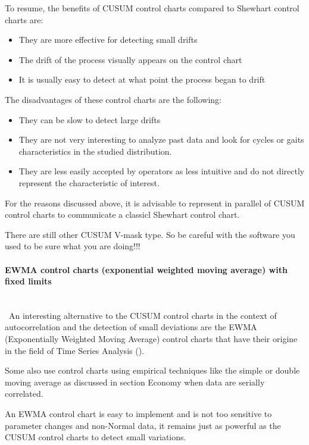 	To resume, the benefits of CUSUM control charts compared to Shewhart control charts are:
	\begin{itemize}
		\item They are more effective for detecting small drifts

		\item The drift of the process visually appears on the control chart

		\item It is usually easy to detect at what point the process began to drift
	\end{itemize}
	The disadvantages of these control charts are the following:
	\begin{itemize}
		\item They can be slow to detect large drifts

		\item They are not very interesting to analyze past data and look for cycles or gaits characteristics in the studied distribution.

		\item They are less easily accepted by operators as less intuitive and do not directly represent the characteristic of interest.
	\end{itemize}
	For the reasons discussed above, it is advisable to represent in parallel of CUSUM control charts to communicate a classicl Shewhart control chart.
	\begin{tcolorbox}[title=Remark,colframe=black,arc=10pt]
	There are still other CUSUM V-mask type. So be careful with the software you used to be sure what you are doing!!!
	\end{tcolorbox}
	
	\paragraph{EWMA control charts (exponential weighted moving average) with fixed limits}\mbox{}\\\
	An interesting alternative to the CUSUM control charts in the context of autocorrelation and the detection of small deviations are the EWMA (Exponentially Weighted Moving Average) control charts that have their origine in the field of Time Series Analysis ().

	\begin{tcolorbox}[title=Remark,colframe=black,arc=10pt]
	Some also use control charts using empirical techniques like the simple or double moving average as discussed in section Economy when data are serially correlated.
	\end{tcolorbox}
	An EWMA control chart is easy to implement and is not too sensitive to parameter changes and non-Normal data, it remains just as powerful as the CUSUM control charts to detect small variations.

